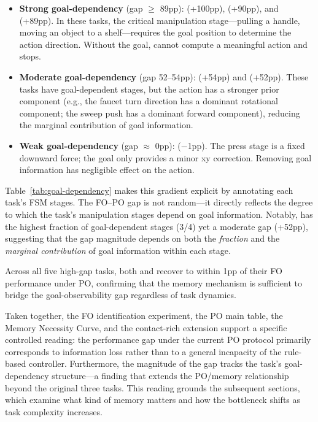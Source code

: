 \begin{itemize}
\item \textbf{Strong goal-dependency} (gap $\geq$ 89pp):  (+100pp),  (+90pp), and  (+89pp). In these tasks, the critical manipulation stage---pulling a handle, moving an object to a shelf---requires the goal position to determine the action direction. Without the goal,  cannot compute a meaningful action and stops.

\item \textbf{Moderate goal-dependency} (gap 52--54pp):  (+54pp) and  (+52pp). These tasks have goal-dependent stages, but the action has a stronger prior component (e.g., the faucet turn direction has a dominant rotational component; the sweep push has a dominant forward component), reducing the marginal contribution of goal information.

\item \textbf{Weak goal-dependency} (gap $\approx$ 0pp):  ($-$1pp). The press stage is a fixed downward force; the goal only provides a minor xy correction. Removing goal information has negligible effect on the action.
\end{itemize}

Table~\ref{tab:goal-dependency} makes this gradient explicit by annotating each task's FSM stages. The FO--PO gap is not random---it directly reflects the degree to which the task's manipulation stages depend on goal information. Notably,  has the highest fraction of goal-dependent stages (3/4) yet a moderate gap (+52pp), suggesting that the gap magnitude depends on both the \emph{fraction} and the \emph{marginal contribution} of goal information within each stage.

Across all five high-gap tasks, both  and  recover to within 1pp of their FO performance under PO, confirming that the memory mechanism is sufficient to bridge the goal-observability gap regardless of task dynamics.

Taken together, the FO identification experiment, the PO main table, the Memory Necessity Curve, and the contact-rich extension support a specific controlled reading: the performance gap under the current PO protocol primarily corresponds to information loss rather than to a general incapacity of the rule-based controller. Furthermore, the magnitude of the gap tracks the task's goal-dependency structure---a finding that extends the PO/memory relationship beyond the original three tasks. This reading grounds the subsequent sections, which examine what kind of memory matters and how the bottleneck shifts as task complexity increases.
